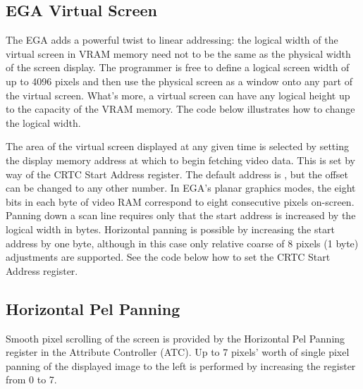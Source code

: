 \documentclass[book.tex]{subfiles}
\begin{document}
\subsection{EGA Virtual Screen}
\label{section:EGA_virtual_screen}

The EGA adds a powerful twist to linear addressing: the logical width of the virtual screen in VRAM memory need not to be the same as the physical width of the screen display. The programmer is free to define a logical screen width of up to 4096 pixels and then use the physical screen as a window onto any part of the virtual screen. What's more, a virtual screen can have any logical height up to the capacity of the VRAM memory. The code below illustrates how to change the logical width.\\

\begin{minipage}{\textwidth}
  
  \end{minipage}
  \label{ega_pel_pan}
  \par

The area of the virtual screen displayed at any given time is selected by setting the display memory address at which to begin fetching video data. This is set by way of the CRTC Start Address register. The default address is , but the offset can be changed to any other number. In EGA's planar graphics modes, the eight bits in each byte of video RAM correspond to eight consecutive pixels on-screen. Panning down a scan line requires only that the start address is increased by the logical width in bytes. Horizontal panning is possible by increasing the start address by one byte, although in this case only relative coarse of 8 pixels (1 byte)  adjustments are supported. See the code below how to set the CRTC Start Address register.

\begin{minipage}{\textwidth}
  
  \end{minipage}
  \label{ega_set_address}
  \par

\subsection{Horizontal Pel Panning}
Smooth pixel scrolling of the screen is provided by the Horizontal Pel Panning register in the Attribute Controller (ATC). Up to 7 pixels' worth of single pixel panning of the displayed image to the left is performed by increasing the register from 0 to 7. \\
\par
\end{document}
